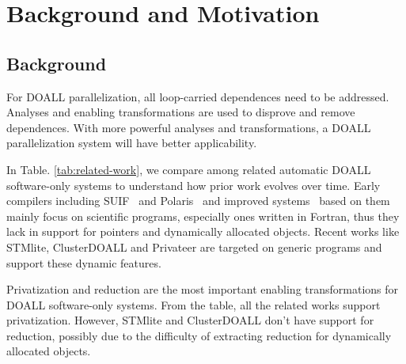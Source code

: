 \section{Background and Motivation}
\label{sec:motivation}

\subsection{Background}




For DOALL parallelization, all loop-carried dependences need to be
addressed. Analyses and enabling transformations are used to disprove and
remove dependences. With more powerful analyses and transformations, a
DOALL parallelization system will have better applicability.

In Table. \ref{tab:related-work}, we compare among related automatic DOALL
software-only systems to understand how prior work evolves over time.
%
Early compilers including SUIF~\cite{blume:96:icpp} and
Polaris~\cite{suif:94:stanford} and improved
systems~\cite{Rus:07:ics,rus:03:hybrid,rauchwerger:99:pds} based on them
mainly focus on scientific programs, especially ones written in
Fortran, thus they lack in support for pointers and dynamically allocated
objects.
%
Recent works like STMlite\cite{mehrara:09:stmlite},
ClusterDOALL\cite{kim:12:cgo} and Privateer\cite{johnson:12:pldi} are
targeted on generic programs and support these dynamic features.

Privatization and reduction are the most important enabling transformations
for DOALL software-only systems. From the table, all the related works
support privatization. However, STMlite and ClusterDOALL don't have support
for reduction, possibly due to the difficulty of extracting reduction for
dynamically allocated objects.

